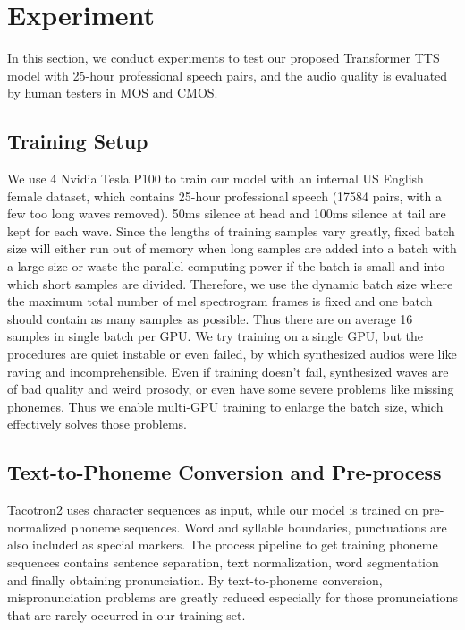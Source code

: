 \documentclass[letterpaper]{article} \usepackage{aaai19}  \usepackage{times}  \usepackage{helvet}  \usepackage{courier}  \usepackage{url}  \usepackage{graphicx}  \frenchspacing
\begin{document}
\section{Experiment}

In this section, we conduct experiments to test our proposed Transformer TTS model with 25-hour professional speech pairs, and the audio quality is evaluated by human testers in MOS and CMOS.

\subsection{Training Setup}

We use 4 Nvidia Tesla P100 to train our model with an internal US English female dataset, which contains 25-hour professional speech (17584  pairs, with a few too long waves removed). 50ms silence at head and 100ms silence at tail are kept for each wave. Since the lengths of training samples vary greatly, fixed batch size will either run out of memory when long samples are added into a batch with a large size or waste the parallel computing power if the batch is small and into which short samples are divided. Therefore, we use the dynamic batch size where the maximum total number of mel spectrogram frames is fixed and one batch should contain as many samples as possible. Thus there are on average 16 samples in single batch per GPU. We try training on a single GPU, but the procedures are quiet instable or even failed, by which synthesized audios were like raving and incomprehensible. Even if training doesn't fail, synthesized waves are of bad quality and weird prosody, or even have some severe problems like missing phonemes. Thus we enable multi-GPU training to enlarge the batch size, which effectively solves those problems.

\subsection{Text-to-Phoneme Conversion and Pre-process}

Tacotron2 uses character sequences as input, while our model is trained on pre-normalized phoneme sequences. Word and syllable boundaries, punctuations are also included as special markers. The process pipeline to get training phoneme sequences contains sentence separation, text normalization, word segmentation and finally obtaining pronunciation. By text-to-phoneme conversion, mispronunciation problems are greatly reduced especially for those pronunciations that are rarely occurred in our training set.
\end{document}

